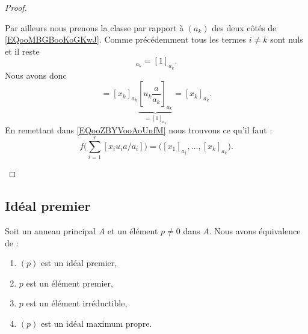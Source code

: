 \begin{proof}
\begin{subproof}
		Par ailleurs nous prenons la classe par rapport à \( (a_k)\) des deux côtés de \eqref{EQooMBGBooKoGKwJ}. Comme précédemment tous les termes \( i\neq k\) sont nuls et il reste
		\begin{equation}
			[u_ka/a_k]_{a_k}=[1]_{a_k}.
		\end{equation}
		Nous avons donc
		\begin{equation}
			[x_ku_k\frac{ a }{ a_k }]=[x_k]_{a_k}\underbrace{[u_k\frac{ a }{ a_k }]_{a_k}}_{=[1]_{a_k}}=[x_k]_{a_k}.
		\end{equation}
		En remettant dans \eqref{EQooZBYVooAoUnfM} nous trouvons ce qu'il faut :
		\begin{equation}
			f\big( \sum_{i=1}^r[x_iu_ia/a_i] \big)=\big( [x_1]_{a_1},\ldots,[x_k]_{a_k} \big).
		\end{equation}
	\end{subproof}
\end{proof}


\subsection{Idéal premier}

\begin{proposition}     \label{PROPooZICGooNmblhl}
	Soit un anneau principal \( A\) et un élément \( p\neq 0\) dans \( A\). Nous avons équivalence de :
	\begin{enumerate}
		\item   \label{ITEMooBTEAooWlFUTX}
		      \( (p)\) est un idéal premier,
		\item   \label{ITEMooKQRMooBNPDMX}
		      \( p\) est un élément premier,
		\item   \label{ITEMooZYYJooCWiBhL}
		      \( p\) est un élément irréductible,
		\item   \label{ITEMooHPAIooYoQzqD}
		      \( (p)\) est un idéal maximum propre.
	\end{enumerate}
\end{proposition}

